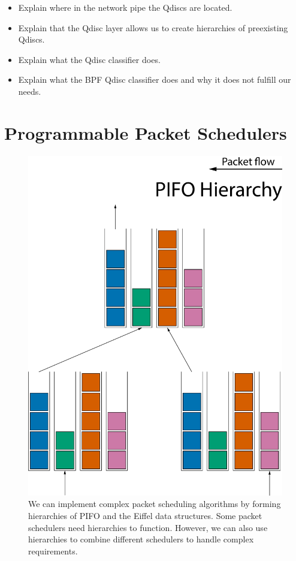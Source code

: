 \documentclass[sigconf, nonacm]{acmart}
\begin{document}
\begin{itemize}
  \item Explain where in the network pipe the Qdiscs are located.
  \item Explain that the Qdisc layer allows us to create hierarchies of preexisting Qdiscs.
  \item Explain what the Qdisc classifier does.
  \item Explain what the BPF Qdisc classifier does and why it does not fulfill our needs.
\end{itemize}


%
%


\section{Programmable Packet Schedulers}

\begin{figure}
  \includegraphics[width=0.5\linewidth]{pifo-hierarchy.pdf}
  \caption{We can implement complex packet scheduling algorithms by forming hierarchies of PIFO and the Eiffel data structures. Some packet schedulers need hierarchies to function. However, we can also use hierarchies to combine different schedulers to handle complex requirements.}
  \label{fig:pifo_hierarchy}
\end{figure}
\end{document}
